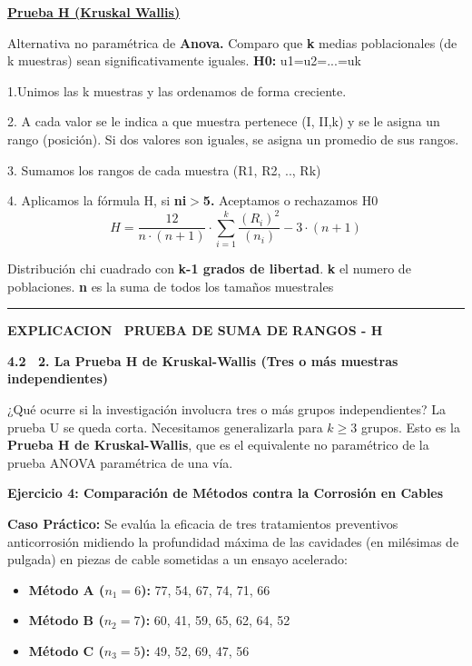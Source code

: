 \documentclass[10pt,a4paper]{article}
\begin{document}
\begin{center}
{\large\bfseries\uline{Prueba H (Kruskal Wallis)}}
\end{center}
\vspace{-2pt}

Alternativa no paramétrica de \textbf{Anova.} Comparo que \textbf{k} medias poblacionales (de k muestras) sean significativamente iguales. \textbf{H0:} u1=u2=...=uk

1.Unimos las k muestras y las ordenamos de forma creciente.

2. A cada valor se le indica a que muestra pertenece (I, II,k) y se le asigna un rango (posición). Si dos valores son iguales, se asigna un promedio de sus rangos.

3. Sumamos los rangos de cada muestra (R1, R2, .., Rk)

4. Aplicamos la fórmula H, si \textbf{ni$>$5.} Aceptamos o rechazamos H0
\[
H = \frac{12}{n\cdot(n+1)}\cdot \sum_{i=1}^{k} \frac{\left(R_i\right)^2}{\left(n_i\right)} - 3\cdot(n+1)
\]

Distribución chi cuadrado con \textbf{k-1 grados de libertad}. \textbf{k} el numero de poblaciones. \textbf{n} es la suma de todos los tamaños muestrales

\vspace{2pt}
\hrule
\vspace{4pt}

\begin{center}
{\large\bfseries EXPLICACION \ PRUEBA DE SUMA DE RANGOS - H}
\end{center}
\vspace{-2pt}

\textbf{4.2 \ 2. La Prueba H de Kruskal-Wallis (Tres o más muestras independientes)}

¿Qué ocurre si la investigación involucra tres o más grupos independientes? La prueba U se queda corta. Necesitamos generalizarla para $k \geq 3$ grupos. Esto es la \textbf{Prueba H de Kruskal-Wallis}, que es el equivalente no paramétrico de la prueba ANOVA paramétrica de una vía.

\textbf{Ejercicio 4: Comparación de Métodos contra la Corrosión en Cables}

\textbf{Caso Práctico:} Se evalúa la eficacia de tres tratamientos preventivos anticorrosión midiendo la profundidad máxima de las cavidades (en milésimas de pulgada) en piezas de cable sometidas a un ensayo acelerado:
\begin{itemize}[leftmargin=16pt,itemsep=1pt,topsep=1pt,parsep=0pt]
  \item \textbf{Método A ($n_1 = 6$):} 77, 54, 67, 74, 71, 66
  \item \textbf{Método B ($n_2 = 7$):} 60, 41, 59, 65, 62, 64, 52
  \item \textbf{Método C ($n_3 = 5$):} 49, 52, 69, 47, 56
\end{itemize}
\end{document}
